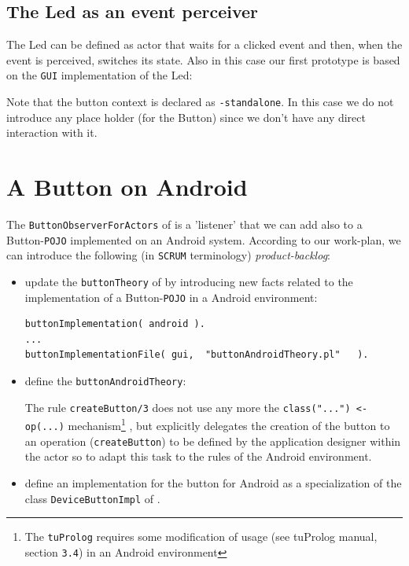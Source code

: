 \subsection{The Led as an event perceiver}
The Led can be defined as actor that waits for a clicked event and then, when the event is perceived, switches its state. Also in this case our first prototype is based on the \texttt{GUI} implementation of the Led:



Note that the button context is declared as \texttt{-standalone}. In this case we do not introduce any place holder (for the Button) since we don't have any direct interaction with it.
 
\newpage 
\section{A Button on Android}
The \texttt{ButtonObserverForActors} of  is a 'listener' that we can add also to a Button-\texttt{POJO} implemented on an Android system. According to our work-plan, we can introduce the following (in \texttt{SCRUM} terminology) \textit{product-backlog}:

\begin{itemize}
\item update the \texttt{buttonTheory} of  by introducing new facts related to the implementation of a Button-\texttt{POJO} in a Android environment:

\begin{lstlisting}
buttonImplementation( android ).
...
buttonImplementationFile( gui,  "buttonAndroidTheory.pl"   ).
\end{lstlisting}

\item define the \texttt{buttonAndroidTheory}:


The rule \texttt{createButton/3} does not use any more the \texttt{class("...") <- op(...)} mechanism\footnote{ The \texttt{tuProlog} requires some modification of usage (see tuProlog manual, section \texttt{3.4}) in an Android environment} , but explicitly delegates the creation of the button to an operation (\texttt{createButton})  to be defined by the application designer within the actor so to adapt this task to the rules of the Android environment.

\item define an implementation for the button for Android as a specialization of the class \texttt{DeviceButtonImpl} of .

\end{itemize}

